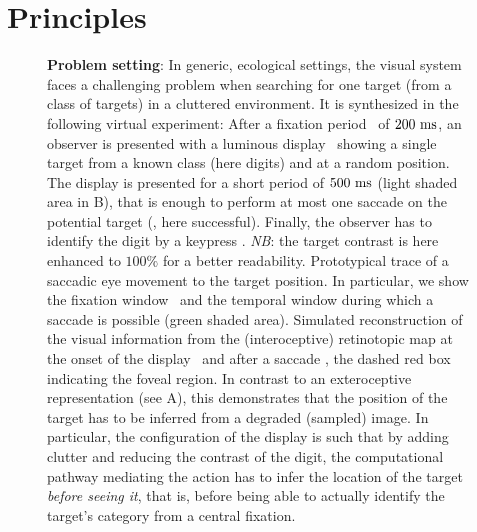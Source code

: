 

\section{Principles}
\label{sec:principles}

\begin{figure}[t!]%
	\caption{%
		{\bf Problem setting}: In generic, ecological settings, the visual system faces a challenging problem when searching for one target (from a class of targets) in a cluttered environment. It is synthesized in the following virtual experiment: %
		\A After a fixation period \FIX\ of $200~\si{\milli\second}$, an observer is presented with a luminous display \DIS\ showing a single target from a known class (here digits) and at a random position. The display is presented for a short period of $500~\si{\milli\second}$ (light shaded area in B), that is enough to perform at most one saccade on the potential target (\SAC , here successful). Finally, the observer has to identify the digit by a keypress \ANS. \emph{NB}: the target contrast is here enhanced to $100\%$ for a better readability. %
		\B Prototypical trace of a saccadic eye movement to the target position. In particular, we show the fixation window \FIX\ and the temporal window during which a saccade is possible (green shaded area). %
		\C Simulated reconstruction of the visual information from the (interoceptive) retinotopic map at the onset of the display \DIS\ and after a saccade \SAC , the dashed red box indicating the foveal region. In contrast to an exteroceptive representation (see A), this demonstrates that the position of the target has to be inferred from a degraded (sampled) image. In particular, the configuration of the display is such that by adding clutter and reducing the contrast of the digit, %
		the computational pathway mediating the action has to infer the location of the target \emph{before seeing it}, that is, before being able to actually identify the target's category from a central fixation. }%
	\label{fig:intro} %
\end{figure}%

